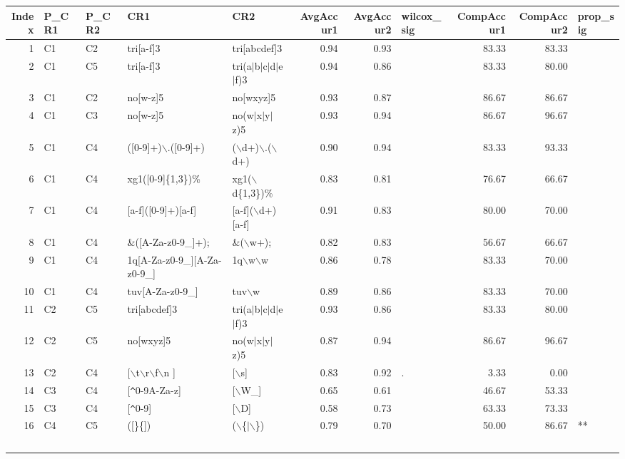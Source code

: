 \begin{table*}[ht]
\centering
\begin{tabular}{rllllrrlrrl}
  \hline
Index & P\_CR1 & P\_CR2 & CR1 & CR2 & AvgAccur1 & AvgAccur2 & wilcox\_sig & CompAccur1 & CompAccur2 & prop\_sig \\ 
  \hline
1 & C1 & C2 & tri[a-f]3 & tri[abcdef]3 & 0.94 & 0.93 &   & 83.33 & 83.33 &   \\ 
  2 & C1 & C5 & tri[a-f]3 & tri(a$|$b$|$c$|$d$|$e$|$f)3 & 0.94 & 0.86 &   & 83.33 & 80.00 &   \\ 
  3 & C1 & C2 & no[w-z]5 & no[wxyz]5 & 0.93 & 0.87 &   & 86.67 & 86.67 &   \\ 
  4 & C1 & C3 & no[w-z]5 & no(w$|$x$|$y$|$z)5 & 0.93 & 0.94 &   & 86.67 & 96.67 &   \\ 
  5 & C1 & C4 & ([0-9]+)$\backslash$.([0-9]+) & ($\backslash$d+)$\backslash$.($\backslash$d+) & 0.90 & 0.94 &   & 83.33 & 93.33 &   \\ 
  6 & C1 & C4 & xg1([0-9]\{1,3\})\% & xg1($\backslash$d\{1,3\})\% & 0.83 & 0.81 &   & 76.67 & 66.67 &   \\ 
  7 & C1 & C4 & [a-f]([0-9]+)[a-f] & [a-f]($\backslash$d+)[a-f] & 0.91 & 0.83 &   & 80.00 & 70.00 &   \\ 
  8 & C1 & C4 & \&([A-Za-z0-9\_]+); & \&($\backslash$w+); & 0.82 & 0.83 &   & 56.67 & 66.67 &   \\ 
  9 & C1 & C4 & 1q[A-Za-z0-9\_][A-Za-z0-9\_] & 1q$\backslash$w$\backslash$w & 0.86 & 0.78 &   & 83.33 & 70.00 &   \\ 
  10 & C1 & C4 & tuv[A-Za-z0-9\_] & tuv$\backslash$w & 0.89 & 0.86 &   & 83.33 & 70.00 &   \\ 
  11 & C2 & C5 & tri[abcdef]3 & tri(a$|$b$|$c$|$d$|$e$|$f)3 & 0.93 & 0.86 &   & 83.33 & 80.00 &   \\ 
  12 & C2 & C5 & no[wxyz]5 & no(w$|$x$|$y$|$z)5 & 0.87 & 0.94 &   & 86.67 & 96.67 &   \\ 
  13 & C2 & C4 & [$\backslash$t$\backslash$r$\backslash$f$\backslash$n ] & [$\backslash$s] & 0.83 & 0.92 & . & 3.33 & 0.00 &   \\ 
  14 & C3 & C4 & [\verb|^|0-9A-Za-z] & [$\backslash$W\_] & 0.65 & 0.61 &   & 46.67 & 53.33 &   \\ 
  15 & C3 & C4 & [\verb|^|0-9] & [$\backslash$D] & 0.58 & 0.73 &   & 63.33 & 73.33 &   \\ 
  16 & C4 & C5 & ([\}\{]) & ($\backslash$\{$|$$\backslash$\}) & 0.79 & 0.70 &   & 50.00 & 86.67 & ** \\ 
$$
\end{tabular}
\end{table*}
